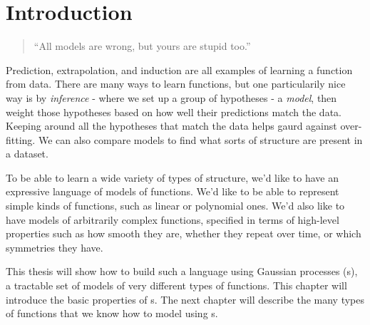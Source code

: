 
\inbpdocument

\chapter{Introduction}
\label{ch:intro}




\begin{quotation}
``All models are wrong, but yours are stupid too.'' \\
\hspace*{\fill} \citet{mlhipster}
\end{quotation}

Prediction, extrapolation, and induction are all examples of learning a function from data.
There are many ways to learn functions, but one particularily nice way is by \emph{inference} - where we set up a group of hypotheses - a \emph{model}, then weight those hypotheses based on how well their predictions match the data.
Keeping around all the hypotheses that match the data helps gaurd against over-fitting.
We can also compare models to find what sorts of structure are present in a dataset.

To be able to learn a wide variety of types of structure, we'd like to have an expressive language of models of functions.  We'd like to be able to represent simple kinds of functions, such as linear or polynomial ones.  We'd also like to have models of arbitrarily complex functions, specified in terms of high-level properties such as how smooth they are, whether they repeat over time, or which symmetries they have.

This thesis will show how to build such a language using Gaussian processes (\gp{}s), a tractable set of models of very different types of functions.
This chapter will introduce the basic properties of \gp{}s.
The next chapter will describe the many types of functions that we know how to model using \gp{}s.




